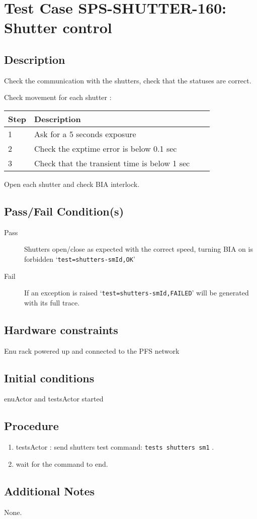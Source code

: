 \section{Test Case SPS-SHUTTER-160: Shutter control}

\subsection{Description}

Check the communication with the shutters, check that the statuses are correct.

\noindent Check movement for each shutter :
\begin{table}[H]
    \begin{tabular}{|l| p{10cm} |l| p{10cm} |}
    \hline
    {\bf Step} & {\bf Description}   \\ \hline
    1 & Ask for a 5 seconds exposure     \\ \hline
    2 & Check the exptime error is below 0.1 sec     \\ \hline
    3 & Check that the transient time is below 1 sec     \\ \hline
    \end{tabular}
\end{table}
\noindent Open each shutter and check BIA interlock.

\subsection{Pass/Fail Condition(s)}

\begin{description}
\item [Pass] Shutters open/close as expected with the correct speed, turning BIA on is forbidden `\texttt{test=shutters-smId,OK}'
\item [Fail] If an exception is raised `\texttt{test=shutters-smId,FAILED}' will be generated with its full trace.
\end{description}

\subsection{Hardware constraints}

Enu rack powered up and connected to the PFS network

\subsection{Initial conditions}
enuActor and testsActor started

\subsection{Procedure}

\begin{enumerate}
    \item testsActor : send shutters test command: \texttt{tests shutters sm1} .
    \item wait for the command to end.
\end{enumerate}



\subsection{Additional Notes}

None.
